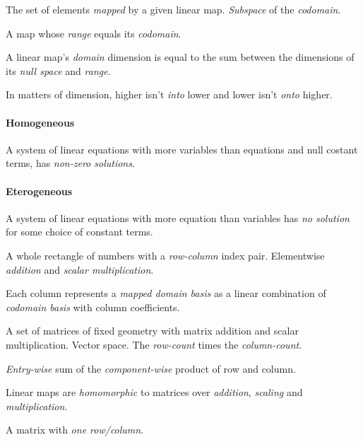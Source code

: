\begin{multicols}{3}
  The set of elements \textit{mapped} by a given linear map.
  \textit{Subspace} of the \textit{codomain}.

  A map whose \textit{range} equals its \textit{codomain}.

  A linear map's \textit{domain} dimension is equal to the sum between the dimensions of its \textit{null space} and \textit{range}.

  In matters of dimension, higher isn't \textit{into} lower and lower isn't \textit{onto} higher.

  \paragraph{\textbf{Homogeneous}}
  A system of linear equations with more variables than equations and null costant terms, has \textit{non-zero solutions}.
  
  \paragraph{\textbf{Eterogeneous}}
  A system of linear equations with more equation than variables has \textit{no solution} for some choice of constant terms.
  
  A whole rectangle of numbers with a \textit{row-column} index pair.
  Elementwise \textit{addition} and \textit{scalar multiplication}.
  
  Each column represents a \textit{mapped domain basis} as a linear combination of \textit{codomain basis} with column coefficients.

  A set of matrices of fixed geometry with matrix addition and scalar multiplication.
  Vector space.
  The \textit{row-count} times the \textit{column-count}.
  
  \textit{Entry-wise} sum of the \textit{component-wise} product of row and column.
  
  Linear maps are \textit{homomorphic} to matrices over \textit{addition}, \textit{scaling} and \textit{multiplication}.

  A matrix with \textit{one row/column}.


\end{multicols}
